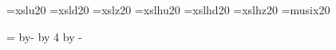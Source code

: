 
\def\mdef#1#2{\def#1{{\musicfnt\char#2}}}

	\parindent=0pt
	\newdimen\interlinedist
	\newcount\n
	\newdimen\balkhoog
	\newdimen\staffrulethickness
	\newdimen\interstaffrule

\def\musixtwentydefs{
	\font\slurufont=xslu20
	\font\slurdfont=xsld20
	\font\slurhfont=xslz20
	\font\hslurufont=xslhu20
	\font\hslurdfont=xslhd20
	\font\hslurhfont=xslhz20
	\font\musicfnt=musix20
	\balkhoog=20pt
	\staffrulethickness=0.4pt
}

\def\musixcalc{
	\interstaffrule=\balkhoog
	\advance\interstaffrule by-\staffrulethickness
	\divide\interstaffrule by 4
	\advance\interstaffrule by -\staffrulethickness
}


\musixtwentydefs
\musixcalc
\def\slurcharh#1{{\slurhfont\char#1}}
\def\slurcharu#1{{\slurufont\char#1}}
\def\slurchard#1{{\slurdfont\char#1}}
\def\hslurcharh#1{{\hslurhfont\char#1}}
\def\hslurcharu#1{{\hslurufont\char#1}}
\def\hslurchard#1{{\hslurdfont\char#1}}

\mdef\quartball{'007}
\mdef\halfball{'010}
\mdef\wholeball{'011}
\mdef\halfrest{'074}
\mdef\wholerest{'075}
\mdef\quartrest{62}
\mdef\eighthrest{63}
\mdef\sixteenthrest{64}
\mdef\thirtysecondrest{65}
\mdef\sharp{52}
\mdef\flat{50}
\mdef\natural{54}
\mdef\sharpsharp{53}
\mdef\flatflat{51}

\mdef\singledot{'00}
\mdef\doubledot{'01}
\mdef\tripledot{'02}
\mdef\mussepline{155}
\mdef\violinclef{71}
\mdef\bassclef{73}

\mdef\deigthflag{45}
\mdef\dsixteenthflag{46}
\mdef\dthirtysecondflag{47}

\mdef\ueigthflag{40}
\mdef\usixteenthflag{41}
\mdef\uthirtysecondflag{42}

\def\maatstreep{\vrule height\balkhoog}
\def\finishbar{\vrule height\balkhoog  width 1pt}
\def\generalmeter#1#2{\vbox to 0pt{\vss\rm\hbox{#1}\hbox{#2}}}
\def\lineseparator{\vbox{\mussepline\vskip -5pt\mussepline}}

\def\beauty{%
	\par\vskip 10pt plus 30pt minus 10pt\par
	\hskip -5pt\lineseparator
	\par\vskip 10pt plus 30pt minus 10pt\par
}

\def\interstaffline{%
	\vskip 10pt
}
\def\ugly{\nointerlineskip\par
\vskip 40pt\par\vbox{\hbox to 0pt{\vrule width30pt height1pt\hss}}\par\vskip 40pt
}
\def\interscoreline{\beauty}


